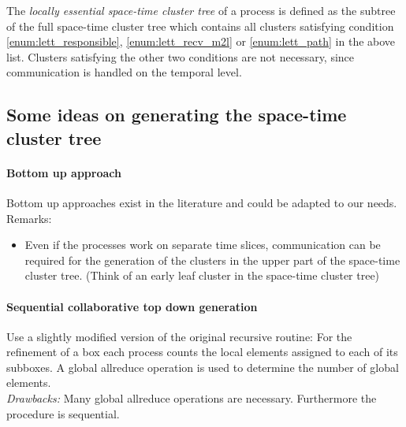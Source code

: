 \documentclass[a4paper,11pt]{article}
\theoremstyle{plain}
\theoremstyle{definition}
\theoremstyle{remark}
\begin{document}
The \textit{locally essential space-time cluster tree} of a process is defined as the subtree of the full space-time cluster tree which contains all clusters satisfying condition \ref{enum:lett_responsible}, \ref{enum:lett_recv_m2l} or \ref{enum:lett_path} in the above list. Clusters satisfying the other two conditions are not necessary, since communication is handled on the temporal level.

\subsection{Some ideas on generating the space-time cluster tree} \label{sec:generation_spacetime_ct}

\paragraph{Bottom up approach}
Bottom up approaches exist in the literature and could be adapted to our needs. Remarks:
\begin{itemize}
  \item Even if the processes work on separate time slices, communication can be required for the generation of the clusters in the upper part of the space-time cluster tree. (Think of an early leaf cluster in the space-time cluster tree)
\end{itemize}


\paragraph{Sequential collaborative top down generation}
Use a slightly modified version of the original recursive routine: For the refinement of a box each process counts the local elements assigned to each of its subboxes. A global allreduce operation is used to determine the number of global elements. \\
\textit{Drawbacks:} Many global allreduce operations are necessary. Furthermore the procedure is sequential.
\end{document}
